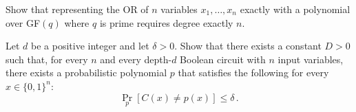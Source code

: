 \documentclass[english]{uebung_cs}
\begin{document}

\begin{exercise}
  Show that representing the OR of $n$ variables $x_1,\dots,x_n$ exactly with a polynomial over GF$(q)$ where $q$ is prime requires degree exactly $n$.
\end{exercise}

\begin{exercise}
  Let $d$ be a positive integer and let $\delta>0$.
  Show that there exists a constant $D>0$ such that, for every $n$ and every depth-$d$ Boolean circuit with $n$ input variables, there exists a probabilistic polynomial $p$ that satisfies the following for every $x\in\{0,1\}^n$:
  \[
    \Pr_p[C(x)\neq p(x)]\leq\delta\,.
  \]
\end{exercise}
\end{document}
